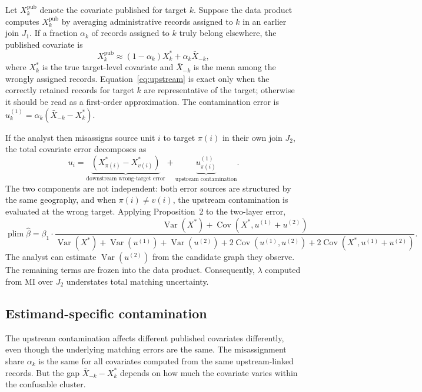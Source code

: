 \documentclass[12pt]{article}
\theoremstyle{remark}
\begin{document}
Let $X_k^{\mathrm{pub}}$ denote the covariate published for target $k$. Suppose the data product computes $X_k^{\mathrm{pub}}$ by averaging administrative records assigned to $k$ in an earlier join $J_1$. If a fraction $\alpha_k$ of records assigned to $k$ truly belong elsewhere, the published covariate is
\begin{equation}
X_k^{\mathrm{pub}}
\approx
(1-\alpha_k)X_k^*+\alpha_k\bar X_{-k},
\label{eq:upstream}
\end{equation}
where $X_k^*$ is the true target-level covariate and $\bar X_{-k}$ is the mean among the wrongly assigned records. Equation~\eqref{eq:upstream} is exact only when the correctly retained records for target $k$ are representative of the target; otherwise it should be read as a first-order approximation. The contamination error is $u_k^{(1)} = \alpha_k(\bar X_{-k} - X_k^*)$.

If the analyst then misassigns source unit $i$ to target $\pi(i)$ in their own join $J_2$, the total covariate error decomposes as
\[
u_i
=
\underbrace{(X_{\pi(i)}^*-X_{v(i)}^*)}_{\text{downstream wrong-target error}}
+
\underbrace{u_{\pi(i)}^{(1)}}_{\text{upstream contamination}}.
\]
The two components are not independent: both error sources are structured by the same geography, and when $\pi(i) \neq v(i)$, the upstream contamination is evaluated at the wrong target. Applying Proposition~2 to the two-layer error,
\begin{equation}\label{eq:twolayer_plim}
    \operatorname{plim}\hat\beta = \beta_1 \cdot
    \frac{\operatorname{Var}(X^*) + \operatorname{Cov}(X^*, u^{(1)} + u^{(2)})}
         {\operatorname{Var}(X^*) + \operatorname{Var}(u^{(1)}) + \operatorname{Var}(u^{(2)}) + 2\operatorname{Cov}(u^{(1)},u^{(2)}) + 2\operatorname{Cov}(X^*, u^{(1)} + u^{(2)})}.
\end{equation}
The analyst can estimate $\operatorname{Var}(u^{(2)})$ from the candidate graph they observe. The remaining terms are frozen into the data product. Consequently, $\lambda$ computed from MI over $J_2$ understates total matching uncertainty.

\subsection{Estimand-specific contamination}

The upstream contamination affects different published covariates differently, even though the underlying matching errors are the same. The misassignment share $\alpha_k$ is the same for all covariates computed from the same upstream-linked records. But the gap $\bar X_{-k} - X_k^*$ depends on how much the covariate varies within the confusable cluster.
\end{document}
